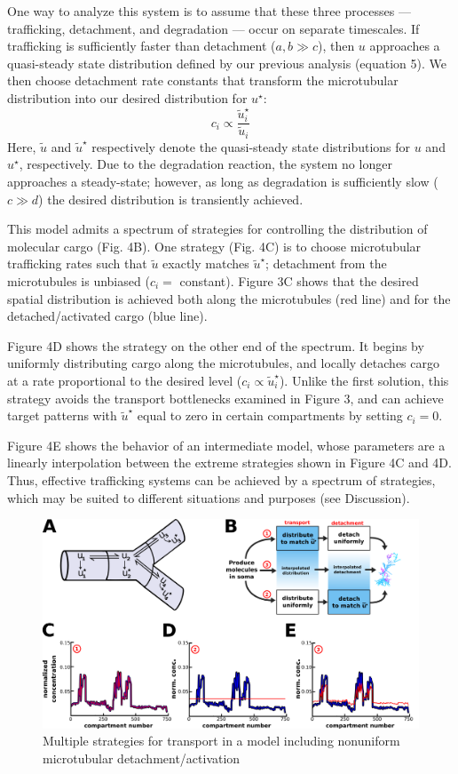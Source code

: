 \documentclass[fleqn,10pt]{wlpeerj}
\begin{document}
One way to analyze this system is to assume that these three processes --- trafficking, detachment, and degradation --- occur on separate timescales. If trafficking is sufficiently faster than detachment ($a,b \gg c$), then $u$ approaches a quasi-steady state distribution defined by our previous analysis (equation 5). We then choose detachment rate constants that transform the microtubular distribution into our desired distribution for $u^\star$:
$$
c_i \propto \frac{\tilde{u}^\star_i}{\tilde{u}_i}
$$
Here, $\tilde{u}$ and $\tilde{u}^\star$ respectively denote the quasi-steady state distributions for $u$ and $u^\star$, respectively. Due to the degradation reaction, the system no longer approaches a steady-state; however, as long as degradation is sufficiently slow ($c \gg d$) the desired distribution is transiently achieved.

This model admits a spectrum of strategies for controlling the distribution of molecular cargo (Fig. 4B). One strategy (Fig. 4C) is to choose microtubular trafficking rates such that $\tilde{u}$ exactly matches $\tilde{u}^\star$; detachment from the microtubules is unbiased ($c_i =$ constant). Figure 3C shows that the desired spatial distribution is achieved both along the microtubules (red line) and for the detached/activated cargo (blue line).

Figure 4D shows the strategy on the other end of the spectrum. It begins by uniformly distributing cargo along the microtubules, and locally detaches cargo at a rate proportional to the desired level ($c_i \propto \tilde{u}^\star_i$). Unlike the first solution, this strategy avoids the transport bottlenecks examined in Figure 3, and can achieve target patterns with  $\tilde{u}^\star$ equal to zero in certain compartments by setting $c_i = 0$. 

Figure 4E shows the behavior of an intermediate model, whose parameters are a linearly interpolation between the extreme strategies shown in Figure 4C and 4D. Thus, effective trafficking systems can be achieved by a spectrum of strategies, which may be suited to different situations and purposes (see Discussion). 

\begin{figure}[h!]
\begin{center}
\includegraphics[width=1\columnwidth]{Fig3.png}
\caption{Multiple strategies for transport in a model including nonuniform microtubular detachment/activation}
\end{center}
\end{figure}
\end{document}

